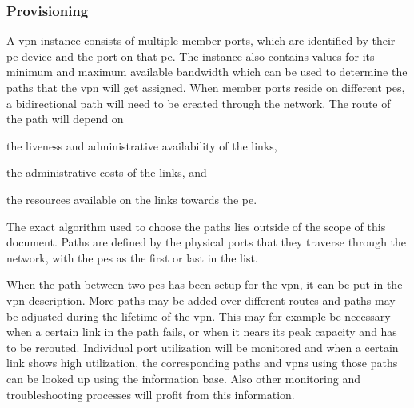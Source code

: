 

\subsubsection{Provisioning} %
\label{ssub:provisioning}



A \ac{vpn} instance consists of multiple member ports, which are identified by their \ac{pe} device and the port on that \ac{pe}. The instance also contains values for its minimum and maximum available bandwidth which can be used to determine the paths that the \ac{vpn} will get assigned. When member ports reside on different \acp{pe}, a bidirectional path will need to be created through the network. The route of the path will depend on 
\begin{inparaenum}
	\item the liveness and administrative availability of the links, 
	\item the administrative costs of the links, and 
	\item the resources available on the links towards the \ac{pe}.
\end{inparaenum}
The exact algorithm used to choose the paths lies outside of the scope of this document. Paths are defined by the physical ports that they traverse through the network, with the \acp{pe} as the first or last in the list.

When the path between two \acp{pe} has been setup for the \ac{vpn}, it can be put in the \ac{vpn} description. More paths may be added over different routes and paths may be adjusted during the lifetime of the \ac{vpn}. This may for example be necessary when a certain link in the path fails, or when it nears its peak capacity and has to be rerouted. 
Individual port utilization will be monitored and when a certain link shows high utilization, the corresponding paths and \acp{vpn} using those paths can be looked up using the information base. Also other monitoring and troubleshooting processes will profit from this information.


